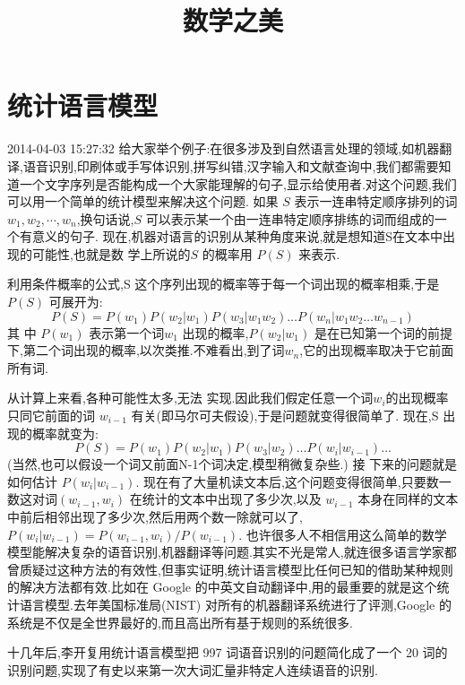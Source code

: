 \documentclass{article}
\begin{document}
\title{数学之美}
\maketitle
\tableofcontents
\newpage
\section{统计语言模型}
 2014-04-03 15:27:32
给大家举个例子:在很多涉及到自然语言处理的领域,如机器翻译,语音识别,印刷体或手写体识别,拼写纠错,汉字输入和文献查询中,我们都需要知道一个文字序列是否能构成一个大家能理解的句子,显示给使用者.对这个问题,我们可以用一个简单的统计模型来解决这个问题. 
如果 $S$ 表示一连串特定顺序排列的词 $w_1, w_2,\cdots, w_n$,换句话说,$S$ 可以表示某一个由一连串特定顺序排练的词而组成的一个有意义的句子.
现在,机器对语言的识别从某种角度来说,就是想知道S在文本中出现的可能性,也就是数 学上所说的$S$ 的概率用 $P(S)$ 来表示.

利用条件概率的公式,S 这个序列出现的概率等于每一个词出现的概率相乘,于是$P(S)$ 可展开为: $$P(S) = P(w_1)P(w_2|w_1)P(w_3| w_1 w_2)…P(w_n|w_1 w_2…w_{n-1})$$ 
其 中 $P(w_1)$ 表示第一个词$w_1$ 出现的概率,$P(w_2|w_1)$ 是在已知第一个词的前提下,第二个词出现的概率,以次类推.不难看出,到了词$w_n$,它的出现概率取决于它前面所有词.

从计算上来看,各种可能性太多,无法 实现.因此我们假定任意一个词$w_i$的出现概率只同它前面的词 $w_{i-1}$ 有关(即马尔可夫假设),于是问题就变得很简单了.
现在,S 出现的概率就变为: $$P(S) = P(w_1)P(w_2|w_1)P(w_3|w_2)…P(w_i|w_{i-1})… $$
(当然,也可以假设一个词又前面N-1个词决定,模型稍微复杂些.) 接 下来的问题就是如何估计 $P (w_i|w_{i-1})$.
现在有了大量机读文本后,这个问题变得很简单,只要数一数这对词$(w_{i-1},w_i)$ 在统计的文本中出现了多少次,以及 $w_{i-1}$ 本身在同样的文本中前后相邻出现了多少次,然后用两个数一除就可以了,$P(w_i|w_{i-1}) = P(w_{i-1},w_i)/ P (w_{i-1})$. 也许很多人不相信用这么简单的数学模型能解决复杂的语音识别,机器翻译等问题.其实不光是常人,就连很多语言学家都曾质疑过这种方法的有效性,但事实证明,统计语言模型比任何已知的借助某种规则的解决方法都有效.比如在 Google 的中英文自动翻译中,用的最重要的就是这个统计语言模型.去年美国标准局(NIST) 对所有的机器翻译系统进行了评测,Google 的系统是不仅是全世界最好的,而且高出所有基于规则的系统很多.

十几年后,李开复用统计语言模型把 997 词语音识别的问题简化成了一个 20 词的识别问题,实现了有史以来第一次大词汇量非特定人连续语音的识别.
\end{document}
